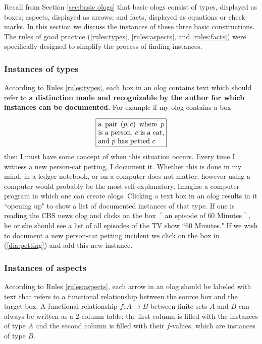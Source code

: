 \documentclass{amsart}
\def\to{\rightarrow}
\def\taking{\colon}
\newcommand{\obox}[3]{\stackrel{#1}{\fbox{\parbox{#2}{#3}}}}
\newcommand{\fakebox}[1]{\tn{$\ulcorner$#1$\urcorner$}}
\theoremstyle{remark}
\theoremstyle{definition}
\def\tn{\textnormal}
\begin{document}
Recall from Section \ref{sec:basic ologs} that basic ologs consist of types, displayed as boxes; aspects, displayed as arrows; and facts, displayed as equations or check-marks. In this section we discuss the instances of these three basic constructions.  The rules of good practice (\ref{rules:types}, \ref{rules:aspects}, and \ref{rules:facts}) were specifically designed to simplify the process of finding instances.

\subsubsection{Instances of types}\label{sec:instances of types}

According to Rules \ref{rules:types}, each box in an olog contains text which should refer to {\bf a distinction made and recognizable by the author for which instances can be documented.}  For example if my olog contains a box \begin{align}\label{dia:petting}\obox{}{1.3in}{a pair $(p,c)$ where $p$ is a person, $c$ is a cat, and $p$ has petted $c$}\end{align} then I must have some concept of when this situation occurs. Every time I witness a new person-cat petting, I document it. Whether this is done in my mind, in a ledger notebook, or on a computer does not matter; however using a computer would probably be the most self-explanatory. Imagine a computer program in which one can create ologs. Clicking a text box in an olog results in it ``opening up" to show a list of documented instances of that type. If one is reading the CBS news olog and clicks on the box \fakebox{an episode of 60 Minutes}, he or she should see a list of all episodes of the TV show ``60 Minutes." If we wish to document a new person-cat petting incident we click on the box in (\ref{dia:petting}) and add this new instance.

\subsubsection{Instances of aspects}

According to Rules \ref{rules:aspects}, each arrow in an olog should be labeled with text that refers to a functional relationship between the source box and the target box. A functional relationship $f\taking A\to B$ between finite sets $A$ and $B$ can always be written as a 2-column table: the first column is filled with the instances of type $A$ and the second column is filled with their $f$-values, which are instances of type $B$. 
\end{document}
